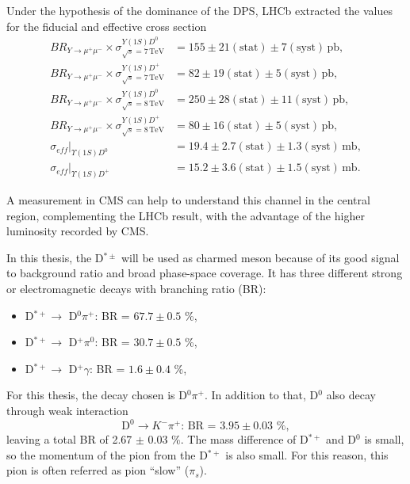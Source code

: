 Under the hypothesis of the dominance of the DPS, LHCb extracted the values for the fiducial and effective cross section
\begin{equation}
\begin{split}
    BR_{Y \rightarrow \mu^+\mu^-} \times \sigma^{Y(1S)D^0}_{\sqrt{s}=7\, \text{TeV}} &= 155 \pm 21 (\text{stat}) \pm 7(\text{syst}) \, \text{pb}, \\
    BR_{Y \rightarrow \mu^+\mu^-} \times \sigma^{Y(1S)D^+}_{\sqrt{s}=7\, \text{TeV}} &= 82 \pm 19 (\text{stat}) \pm 5(\text{syst}) \, \text{pb}, \\
    BR_{Y \rightarrow \mu^+\mu^-} \times \sigma^{Y(1S)D^0}_{\sqrt{s}=8\, \text{TeV}} &= 250 \pm 28 (\text{stat}) \pm 11(\text{syst}) \, \text{pb}, \\
    BR_{Y \rightarrow \mu^+\mu^-} \times \sigma^{Y(1S)D^+}_{\sqrt{s}=8\, \text{TeV}} &= 80 \pm 16 (\text{stat}) \pm 5(\text{syst}) \, \text{pb}, \\
    \sigma_{eff}|_{\Upsilon(1S)D^0} &= 19.4 \pm 2.7 (\text{stat}) \pm 1.3 (\text{syst}) \, \text{mb}, \\
    \sigma_{eff}|_{\Upsilon(1S)D^+} &= 15.2 \pm 3.6 (\text{stat}) \pm 1.5 (\text{syst}) \, \text{mb}. 
\end{split}
\end{equation}

A measurement in CMS can help to understand this channel in the central region, complementing the LHCb result, with the advantage of the higher luminosity recorded by CMS.

In this thesis, the D$^{*\pm}$ will be used as charmed meson because of its good signal to background ratio and broad phase-space coverage. It has three different strong or electromagnetic decays \cite{Workman:2022ynf} with branching ratio (BR):
\begin{itemize}
    \item D$^{*+} \rightarrow$ D$^0 \pi^+$: BR = $67.7 \pm 0.5$ \%,
    \item D$^{*+} \rightarrow$ D$^+ \pi^0$: BR = $30.7 \pm 0.5$ \%,
    \item D$^{*+} \rightarrow$ D$^+ \gamma$: BR = $1.6 \pm 0.4$ \%,
\end{itemize}

For this thesis, the decay chosen is D$^0 \pi^+$. In addition to that, D$^0$ also decay through weak interaction
\begin{equation*}
    \text{D}^0 \rightarrow K^- \pi^+\text{: BR = } 3.95\pm0.03\text{ \%},
\end{equation*}
leaving a total BR of 2.67 $\pm$ 0.03 \%. The mass difference of D$^{*+}$ and D$^0$ is small, so the momentum of the pion from the D$^{*+}$ is also small. For this reason, this pion is often referred as pion ``slow'' ($\pi_s$).

